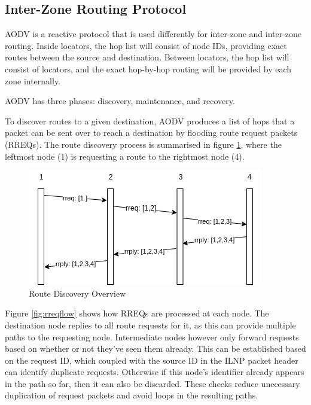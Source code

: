 \documentclass[12pt]{article}
\begin{document}
\subsection{Inter-Zone Routing Protocol}

AODV is a reactive protocol that is used differently for inter-zone and inter-zone routing. Inside locators, the hop list will consist of node IDs, providing exact routes between the source and destination. Between locators, the hop list will consist of locators, and the exact hop-by-hop routing will be provided by each zone internally.

AODV has three phases: discovery, maintenance, and recovery.

To discover routes to a given destination, AODV produces a list of hops that a packet can be sent over to reach a destination by flooding route request packets (RREQs). The route discovery process is summarised in figure \ref{fig:path}, where the leftmost node (1) is requesting a route to the rightmost node (4).

\begin{figure}[!ht]
	\centering
	\includegraphics[width=\linewidth]{images/path}
	\caption{Route Discovery Overview}
	\label{fig:path}
\end{figure}

Figure \ref{fig:rreqflow} shows how RREQs are processed at each node. The destination node replies to all route requests for it, as this can provide multiple paths to the requesting node. Intermediate nodes however only forward requests based on whether or not they've seen them already. This can be established based on the request ID, which coupled with the source ID in the ILNP packet header can identify duplicate requests. Otherwise if this node's identifier already appears in the path so far, then it can also be discarded. These checks reduce unecessary duplication of request packets and avoid loops in the resulting paths.
\end{document}
